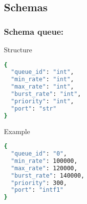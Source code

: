 \newpage
\subsection{Schemas}

\subsubsection{Schema queue:}
\label{switch_queue}
\begin{codes}
\item[Structure] \begin{lstlisting}[language=bash]
{
  "queue_id": "int",
  "min_rate": "int",
  "max_rate": "int",
  "burst_rate": "int",
  "priority": "int",
  "port": "str"
}
\end{lstlisting}
\end{codes}
\begin{codes}
\item[Example] \begin{lstlisting}[language=bash]
{
  "queue_id": "0",
  "min_rate": 100000,
  "max_rate": 120000,
  "burst_rate": 140000,
  "priority": 300,
  "port": "intf1"
}
\end{lstlisting}
\end{codes}

\newpage
